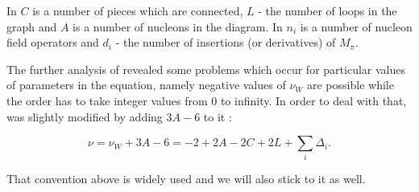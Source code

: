 In  $C$ is a number of pieces which are connected, $L$ - the number of loops in the graph
and $A$ is a number of nucleons in the diagram.
In  $n_i$ is a number of nucleon field operators and $d_i$ - the number of insertions
(or derivatives) of  $M_\pi$.

The further analysis of  revealed some problems which occur 
for particular values of parameters in the equation, namely negative values of $\nu_W$ 
are possible while the order has to take integer values from 0 to infinity.
In order to deal with that,  
was slightly modified by adding $3A - 6$ to it  \cite{Machleidt2011, EPELBAUM2006_PROGRESS}:

\begin{equation}
    \nu = \nu_W + 3A  - 6 = -2 + 2A - 2C + 2L + \sum_i \Delta_i.
    \label{powers_corrected}
\end{equation}

That convention above is widely used and we will also stick to it as well.

